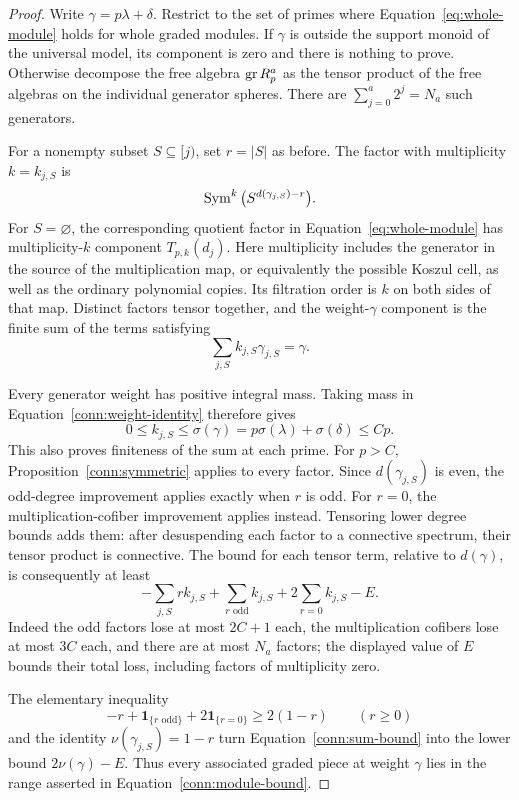 \begin{proof}
Write $\gamma=p\lambda+\delta$. Restrict to the set of primes
where Equation~\eqref{eq:whole-module} holds for whole graded
modules. If $\gamma$ is outside the support monoid of the
universal model, its component is zero and there is nothing to
prove. Otherwise decompose the free algebra $\operatorname{gr} R_p^a$ as the
tensor product of the free algebras on the individual generator
spheres. There are
$\sum_{j=0}^a2^j=N_a$ such generators.

For a nonempty subset $S\subseteq[j)$, set $r=|S|$ as before.
The factor with multiplicity $k=k_{j,S}$ is
\[
 \operatorname{Sym}^k\big(S^{d(\gamma_{j,S})-r}\big).
\]
For $S=\varnothing$, the corresponding quotient factor in
Equation~\eqref{eq:whole-module} has multiplicity-$k$ component
$T_{p,k}(d_j)$. Here multiplicity includes the generator in
the source of the multiplication map, or equivalently the
possible Koszul cell, as well as the ordinary polynomial
copies. Its filtration order is $k$ on both sides of that
map. Distinct factors tensor together, and the weight-$\gamma$
component is the finite sum of the terms satisfying
\begin{equation}\label{conn:weight-identity}
 \sum_{j,S}k_{j,S}\gamma_{j,S}=\gamma.
\end{equation}

Every generator weight has positive integral mass. Taking mass
in Equation~\eqref{conn:weight-identity} therefore gives
\[
 0\leq k_{j,S}\leq\sigma(\gamma)
     =p\sigma(\lambda)+\sigma(\delta)\leq Cp.
\]
This also proves finiteness of the sum at each prime. For
$p>C$, Proposition~\ref{conn:symmetric} applies to every
factor. Since $d(\gamma_{j,S})$ is even, the odd-degree
improvement applies exactly when $r$ is odd. For $r=0$, the
multiplication-cofiber improvement applies instead.
Tensoring lower degree bounds adds them: after desuspending
each factor to a connective spectrum, their tensor product is
connective. The bound for each tensor term, relative to
$d(\gamma)$, is consequently at least
\begin{equation}\label{conn:sum-bound}
 -\sum_{j,S}r k_{j,S}
 +\sum_{r\text{ odd}} k_{j,S}
 +2\sum_{r=0}k_{j,S}-E.
\end{equation}
Indeed the odd factors lose at most $2C+1$ each, the
multiplication cofibers lose at most $3C$ each, and there are
at most $N_a$ factors; the displayed value of $E$ bounds their
total loss, including factors of multiplicity zero.

The elementary inequality
\[
 -r+\mathbf 1_{\{r\text{ odd}\}}
       +2\mathbf 1_{\{r=0\}}\geq2(1-r)
 \qquad(r\geq0)
\]
and the identity $\nu(\gamma_{j,S})=1-r$ turn
Equation~\eqref{conn:sum-bound} into the lower bound
$2\nu(\gamma)-E$. Thus every associated graded piece at
weight $\gamma$ lies in the range asserted in
Equation~\eqref{conn:module-bound}.


\end{proof}
